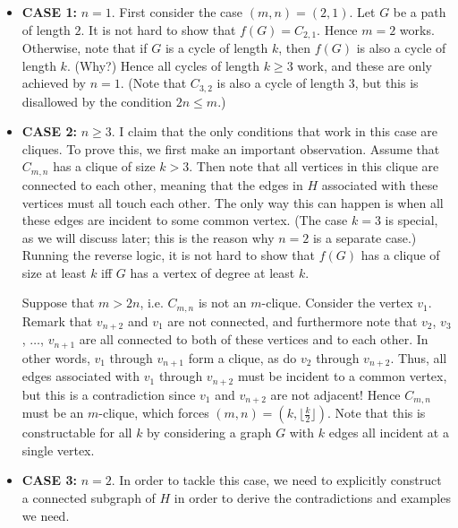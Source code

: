 \documentclass[10pt]{article}
\begin{document}
\begin{enumerate}
\begin{itemize}

\item \textbf{CASE 1: }$n=1$.  First consider the case $(m,n)=(2,1)$.  Let $G$ be a path of length $2$.  It is not hard to show that $f(G)=C_{2,1}$.  Hence $m=2$ works.  Otherwise, note that if $G$ is a cycle of length $k$, then $f(G)$ is also a cycle of length $k$.  (Why?) Hence all cycles of length $k\geq 3$ work, and these are only achieved by $n=1$.  (Note that $C_{3,2}$ is also a cycle of length $3$, but this is disallowed by the condition $2n\leq m$.)

\item \textbf{CASE 2: }$n\geq 3$.  I claim that the only conditions that work in this case are cliques.  To prove this, we first make an important observation.  Assume that $C_{m,n}$ has a clique of size $k>3$.  Then note that all vertices in this clique are connected to each other, meaning that the edges in $H$ associated with these vertices must all touch each other.  The only way this can happen is when all these edges are incident to some common vertex.  (The case $k=3$ is special, as we will discuss later; this is the reason why $n=2$ is a separate case.)  Running the reverse logic, it is not hard to show that $f(G)$ has a clique of size at least $k$ iff $G$ has a vertex of degree at least $k$. 

\par Suppose that $m>2n$, i.e. $C_{m,n}$ is not an $m$-clique.  Consider the vertex $v_1$.  Remark that $v_{n+2}$ and $v_1$ are not connected, and furthermore note that $v_2$, $v_3$, $\ldots$, $v_{n+1}$ are all connected to both of these vertices and to each other.  In other words, $v_1$ through $v_{n+1}$ form a clique, as do $v_2$ through $v_{n+2}$.  Thus, all edges associated with $v_1$ through $v_{n+2}$ must be incident to a common vertex, but this is a contradiction since $v_1$ and $v_{n+2}$ are not adjacent!  Hence $C_{m,n}$ must be an $m$-clique, which forces $(m,n)=(k,\lfloor\tfrac k2\rfloor)$.  Note that this is constructable for all $k$ by considering a graph $G$ with $k$ edges all incident at a single vertex.

\item \textbf{CASE 3: }$n=2$.  In order to tackle this case, we need to explicitly construct a connected subgraph of $H$ in order to derive the contradictions and examples we need.


\end{itemize}
\end{enumerate}
\end{document}
